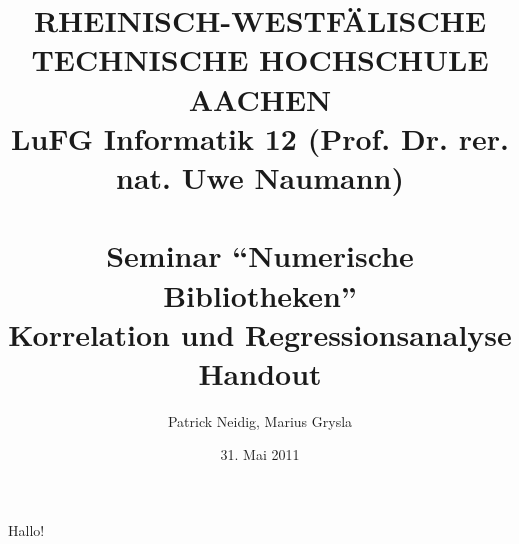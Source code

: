 \documentclass[a4paper]{article}
\title{
{\bf \scriptsize RHEINISCH-WESTF\"ALISCHE TECHNISCHE HOCHSCHULE AACHEN \\
LuFG Informatik 12 (Prof. Dr. rer. nat. Uwe Naumann)}\\
~\\
Seminar ``Numerische Bibliotheken''\\
{\bf \Large Korrelation und Regressionsanalyse} \\
{\large Handout} 
}
\author{Patrick Neidig, Marius Grysla}
\date{31. Mai 2011}
\begin{document}
\maketitle

Hallo!
\end{document}
